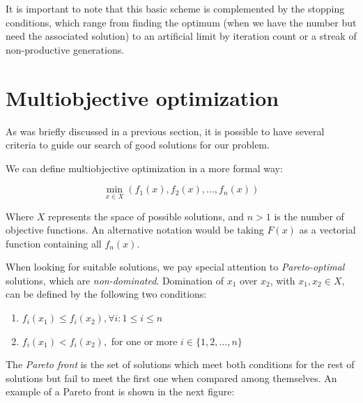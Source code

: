 	    It is important to note that this basic scheme is complemented by the stopping conditions, which range from finding the optimum (when we have the number but need the associated solution) to an artificial limit by iteration count or a streak of non-productive generations.

\section{Multiobjective optimization}

	As was briefly discussed in a previous section, it is possible to have several criteria to guide our search of good solutions for our problem.

	We can define multiobjective optimization in a more formal way:

	\begin{equation}
		\min_{x \in X}(f_1(x),f_2(x),...,f_n(x))
	\end{equation}

	Where $X$ represents the space of possible solutions, and $n > 1$ is the number of objective functions. An alternative notation would be taking $F(x)$ as a vectorial function containing all $f_n(x)$.

	When looking for suitable solutions, we pay special attention to \textit{Pareto-optimal} solutions, which are \textit{non-dominated}. Domination of $x_1$ over $x_2$, with $x_1,x_2 \in X$, can be defined by the following two conditions:

	\begin{enumerate}

		\item
		$f_i(x_1) \leq f_i(x_2), \forall i : 1\leq i \leq n$

		\item
		$f_i(x_1) < f_i(x_2),$ for one or more $i \in \{1,2,...,n\}$

	\end{enumerate}

\newpage

	The \textit{Pareto front} is the set of solutions which meet both conditions for the rest of solutions but fail to meet the first one when compared among themselves. An example of a Pareto front is shown in the next figure:

	\vspace{0.2cm}

